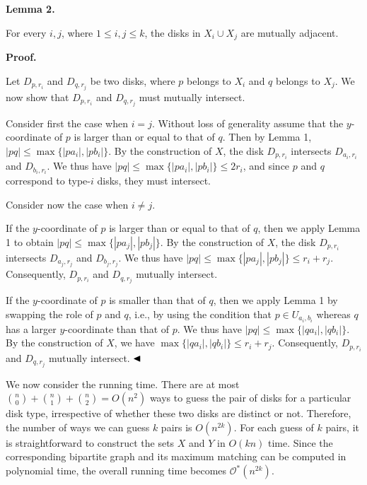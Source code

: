 \par
\par
\par\medskip\noindent\textbf{Lemma 2.}\par
For every $i,j$, where $1\leq i,j\leq k$, the disks in $X_{i}\cup X_{j}$ are mutually adjacent.
\par
\par
\par
\par\medskip\noindent\textbf{Proof.}\par
Let $D_{p,r_{i}}$ and $D_{q,r_{j}}$ be two disks, where $p$ belongs to $X_{i}$ and $q$ belongs to $X_{j}$. We now show that $D_{p,r_{i}}$ and $D_{q,r_{j}}$ must mutually intersect.
\par
\par
Consider first the case when $i=j$. Without loss of generality assume that the $y$-coordinate of $p$ is larger than or equal to that of $q$. Then by Lemma 1, $|pq|\leq\max\{|pa_{i}|,|pb_{i}|\}$. By the construction of $X$, the disk $D_{p,r_{i}}$ intersects $D_{a_{i},r_{i}}$ and $D_{b_{i},r_{i}}$. We thus have $|pq|\leq\max\{|pa_{i}|,|pb_{i}|\}\leq 2r_{i}$, and since $p$ and $q$ correspond to type-$i$ disks, they must intersect.
\par
\par
Consider now the case when $i\not=j$.
\par
\par
If the $y$-coordinate of $p$ is larger than or equal to that of $q$, then we apply Lemma 1 to obtain $|pq|\leq\max\{|pa_{j}|,|pb_{j}|\}$. By the construction of $X$, the disk $D_{p,r_{i}}$ intersects $D_{a_{j},r_{j}}$ and $D_{b_{j},r_{j}}$. We thus have $|pq|\leq\max\{|pa_{j}|,|pb_{j}|\}\leq r_{i}+r_{j}$. Consequently, $D_{p,r_{i}}$ and $D_{q,r_{j}}$ mutually intersect.
\par
\par
If the $y$-coordinate of $p$ is smaller than that of $q$, then we apply Lemma 1 by swapping the role of $p$ and $q$, i.e., by using the condition that $p\in U_{a_{i},b_{i}}$ whereas $q$ has a larger $y$-coordinate than that of $p$. We thus have $|pq|\leq\max\{|qa_{i}|,|qb_{i}|\}$. By the construction of $X$, we have $\max\{|qa_{i}|,|qb_{i}|\}\leq r_{i}+r_{j}$. Consequently, $D_{p,r_{i}}$ and $D_{q,r_{j}}$ mutually intersect. $\hfill\blacktriangleleft$
\par
\par
We now consider the running time. There are at most $\binom{n}{0}+\binom{n}{1}+\binom{n}{2}=O(n^{2})$ ways to guess the pair of disks for a particular disk type, irrespective of whether these two disks are distinct or not. Therefore, the number of ways we can guess $k$ pairs is $O(n^{2k})$. For each guess of $k$ pairs, it is straightforward to construct the sets $X$ and $Y$ in $O(kn)$ time. Since the corresponding bipartite graph and its maximum matching can be computed in polynomial time, the overall running time becomes $\mathcal{O}^{*}(n^{2k})$.
